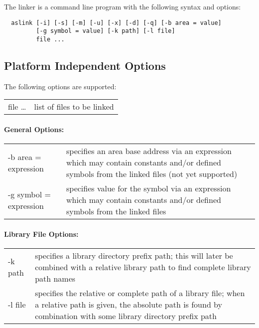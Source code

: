 \documentclass[10pt]{article}
\newenvironment{optionList}{\begin{center}\begin{tabular}{p{4cm}p{8cm}}}%
                           {\end{tabular}\end{center}}
\begin{document}
The linker is a command line program with the following syntax and
options:

\begin{verbatim}
  aslink [-i] [-s] [-m] [-u] [-x] [-d] [-q] [-b area = value] 
         [-g symbol = value] [-k path] [-l file]
         file ...
\end{verbatim}

\subsection{Platform Independent Options}

The following options are supported:

\begin{optionList}
  file \dots&list of files  to  be linked
\end{optionList}

\paragraph{General Options:}
  \begin{optionList}
    -b area = expression & specifies an area base address via an
                           expression which may contain constants
                           and/or defined symbols from the linked
                           files (not yet supported)\\

    -g symbol = expression & specifies value for the symbol via an
                             expression which may contain constants
                             and/or defined symbols from the linked
                             files
  \end{optionList}


\paragraph{Library File Options:}
  \begin{optionList}
    -k path & specifies a library directory prefix path; this will
              later be combined with a relative library path to find
              complete library path names\\

    -l file & specifies the relative or complete path of a library
              file; when a relative path is given, the absolute path
              is found by combination with some library directory
              prefix path
  \end{optionList}
\end{document}
